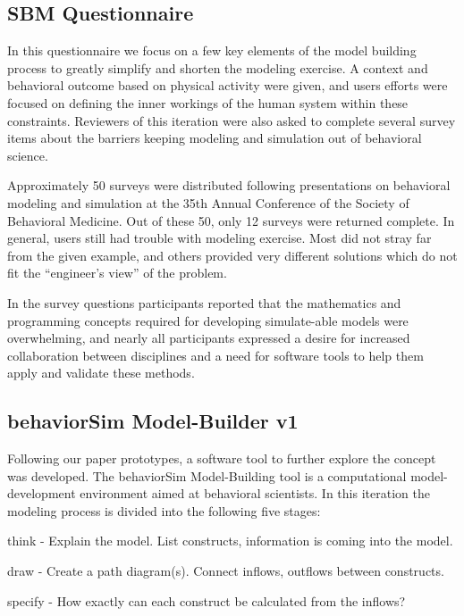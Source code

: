 \documentclass[conference]{IEEEtran}
\begin{document}
\subsection{SBM Questionnaire}
In this questionnaire we focus on a few key elements of the model building process to greatly simplify and shorten the modeling exercise.
A context and behavioral outcome based on physical activity were given, and users efforts were focused on defining the inner workings of the human system within these constraints.
Reviewers of this iteration were also asked to complete several survey items about the barriers keeping modeling and simulation out of behavioral science.

Approximately 50 surveys were distributed following presentations on behavioral modeling and simulation at the 35th Annual Conference of the Society of Behavioral Medicine. 
Out of these 50, only 12 surveys were returned complete.
In general, users still had trouble with modeling exercise.
Most did not stray far from the given example, and others provided very different solutions which do not fit the ``engineer's view'' of the problem.

In the survey questions participants reported that the mathematics and programming concepts required for developing simulate-able models were overwhelming, and nearly all participants expressed a desire for increased collaboration between disciplines and a need for software tools to help them apply and validate these methods.
  
\subsection{behaviorSim Model-Builder v1}
Following our paper prototypes, a software tool to further explore the concept was developed.
The behaviorSim Model-Building tool is a computational model-development environment aimed at behavioral scientists.
In this iteration the modeling process is divided into the following five stages:

think - 
Explain the model.  
List constructs, information is coming into the model.

draw - 
Create a path diagram(s). 
Connect inflows, outflows between constructs. 

specify - 
How exactly can each construct be calculated from the inflows? 
\end{document}
